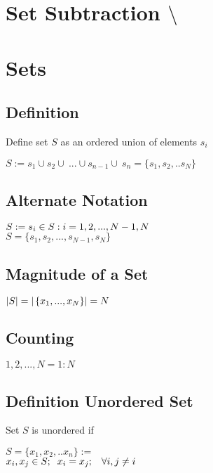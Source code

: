 \documentclass[11pt]{article}
\begin{document}
\section{Set Subtraction $\setminus$}


\section{Sets}




\subsection{Definition}
Define set $S$ as an ordered union of elements $s_i$

\begin{center}
$
S :=   s_1 \cup  s_2 \cup\ ... \cup s_{n-1} \cup\ s_n = \{s_1,s_2,..s_N\}
$
\end{center}
\subsection{Alternate Notation}
\begin{center}
$
S := s_i \in  S :  i=1,2,...,N-1,N \hspace{5mm}$
\\$
S = \{s_1,s_2,...,s_{N-1},s_N\}
$

\end{center}





\subsection{Magnitude of a Set}
\begin{center}
$
|S| = |\hspace{.5mm} \{x_1,...,x_N\}| = N
$
\end{center}


\subsection{Counting}
\begin{center}
$1,2,...,N = 1:N$
\end{center}



\subsection{Definition Unordered Set}
Set $S$ is unordered if
\begin{center}
$
S = \{x_1,x_2,..x_n\} :=
$
\\
$
x_i,x_j \in S; \hspace{2mm} x_i = x_j; \hspace{3mm}\forall i,j \neq i
$
\end{center}
\end{document}
